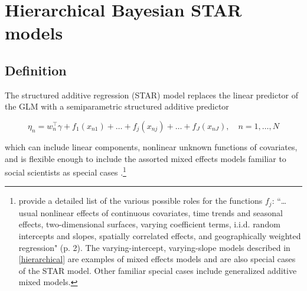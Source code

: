\section{Hierarchical Bayesian STAR models}
\label{star}

\subsection{Definition}

%
%

The structured additive regression (STAR) model replaces the linear predictor of the 
GLM with a semiparametric structured additive predictor

\begin{equation*}
  \eta_n =  w_n^\intercal\gamma + f_1(x_{n1}) + \ldots + f_j(x_{nj}) + \ldots + f_J(x_{nJ}), \quad n = 1, \dots, N 
\end{equation*}

\noindent which can include linear components, nonlinear unknown functions of covariates, 
and is flexible enough to include the assorted mixed effects models familiar to social scientists as 
special cases .\footnote{ provide a 
detailed list of the various possible roles for the functions $f_j$: ``\dots usual nonlinear effects of 
continuous covariates, time trends and seasonal effects, two-dimensional surfaces, varying coefficient 
terms, i.i.d. random intercepts and slopes, spatially correlated effects, and geographically weighted 
regression" (p. 2). The varying-intercept, varying-slope models described in \ref{hierarchical} 
are examples of mixed effects models and are also special cases of the STAR model. Other familiar 
special cases include generalized additive mixed models.} 

